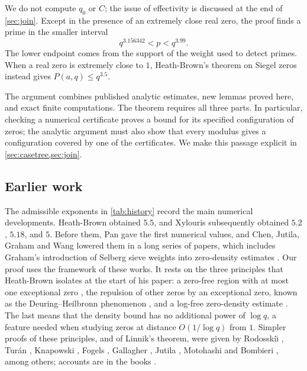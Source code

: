 \documentclass[11pt]{amsart}
\numberwithin{equation}{section}
\theoremstyle{plain}
\theoremstyle{definition}
\theoremstyle{remark}
\newcommand{\1}{\mathbf{1}}
\begin{document}
We do not compute $q_0$ or $C$; the issue of effectivity is discussed at the end of
\cref{sec:join}. Except in the presence of an extremely close real zero, the proof finds a
prime in the smaller interval
\[
  q^{3.156342}<p<q^{3.99}.
\]
The lower endpoint comes from the support of the weight used to detect primes. When a
real zero is extremely close to $1$, Heath-Brown's theorem on Siegel zeros
\cite{HeathBrown1990siegel} instead gives $P(a,q)\le q^{3.5}$.

The argument combines published analytic estimates, new lemmas proved here, and exact
finite computations. The theorem requires all three parts. In particular, checking a
numerical certificate proves a bound for its specified configuration of zeros; the
analytic argument must also show that every modulus gives a configuration covered by
one of the certificates. We make this passage explicit in \cref{sec:casetree,sec:join}.

\subsection{Earlier work}
The admissible exponents in \cref{tab:history} record the main numerical developments.
Heath-Brown \cite{HeathBrown1992zero} obtained $5.5$, and Xylouris
\cite{Xylouris2009linnik,Xylouris2011least,Xylouris2011nullstellen,Xylouris2018linnik}
subsequently obtained $5.2$, $5.18$, and $5$. Before them, Pan \cite{Pan1957least,Pan1958least} gave
the first numerical values, and Chen, Jutila, Graham and Wang lowered them in a long series of
papers, which includes Graham's introduction of Selberg sieve weights into zero-density estimates
\cite{Graham1977thesis,Graham1981linnik}. Our proof uses the framework of these works. It rests on
the three principles that Heath-Brown isolates at the start of his paper: a zero-free region
with at most one exceptional zero
\cite{delaValleePoussin1896recherches,Gronwall1913series,Landau1918imaginar,Page1935number}, the
repulsion of other zeros by an exceptional zero, known as the Deuring--Heilbronn phenomenon
\cite{Deuring1933imaginare,Heilbronn1934class,Linnik1944deuring}, and a log-free zero-density
estimate \cite{Linnik1944least}. The last means that the density bound has no additional power of
$\log q$, a feature needed when studying zeros at distance $O(1/\log q)$ from $1$. Simpler proofs
of these principles, and of Linnik's theorem, were given by Rodosski\u\i{} \cite{Rodosskii1954least},
Tur\'an \cite{Turan1961density,Turan1984new}, Knapowski \cite{Knapowski1962linnik}, Fogels
\cite{Fogels1965zeros}, Gallagher \cite{Gallagher1970large}, Jutila \cite{Jutila1972density},
Motohashi \cite{Motohashi1975density,Motohashi1978primes} and Bombieri \cite{Bombieri1987grand},
among others; accounts are in the books \cite{Prachar1957primzahlverteilung,Montgomery1971topics,
IwaniecKowalski2004analytic,FriedlanderIwaniec2010opera}.
\end{document}
